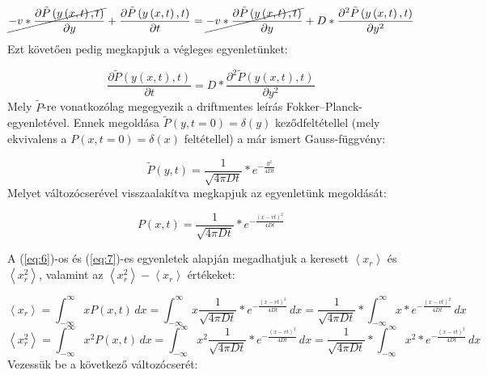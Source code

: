 \hrulefill
\begin{equation}
    \cancel{-v * \frac{\partial \tilde{P} \left( y \left( x, t \right), t \right)}{\partial y}}
    +
    \frac{\partial \tilde{P} \left( y \left( x, t \right), t \right)}{\partial t}
    =
    \cancel{-
    v * \frac{\partial \tilde{P} \left( y \left( x, t \right), t \right)}{\partial y}}
    +
    D * \frac{\partial^{2} \tilde{P} \left( y \left( x, t \right), t \right)}{\partial y^{2}}
\end{equation}
Ezt követően pedig megkapjuk a végleges egyenletünket:

\begin{equation}
    \frac{\partial \tilde{P} \left( y \left( x, t \right), t \right)}{\partial t}
    =
    D * \frac{\partial^{2} \tilde{P} \left( y \left( x, t \right), t \right)}{\partial y^{2}}
\end{equation}
Mely $\tilde{P}$-re vonatkozólag megegyezik a driftmentes leírás Fokker--Planck-egyenletével. Ennek megoldása $\tilde{P} \left( y, t = 0 \right) = \delta \left( y \right)$ keződfeltétellel (mely ekvivalens a $P \left( x, t = 0 \right) = \delta \left( x \right)$ feltétellel) a már ismert Gauss-függvény:

\begin{equation}
    \tilde{P} \left( y, t \right) = \frac{1}{\sqrt{4 \pi D t}} * e^{-\tfrac{y^{2}}{4Dt}}
\end{equation}
Melyet változócserével visszaalakítva megkapjuk az egyenletünk megoldását:

\begin{equation}
    \boxed{P \left( x, t \right) = \frac{1}{\sqrt{4 \pi D t}} * e^{-\tfrac{\left( x - vt \right)^{2}}{4Dt}}}
\end{equation}

A (\ref{eq:6})-os és (\ref{eq:7})-es egyenletek alapján megadhatjuk a keresett $\left< x_{r} \right>$ és $\left< x_{r}^{2} \right>$, valamint az $\left< x_{r}^{2} \right> - \left< x_{r} \right>$ értékeket:

\begin{equation}
    \left< x_{r} \right>
    =
    \int_{- \infty}^{\infty} x P \left( x, t \right)\, dx
    =
    \int_{- \infty}^{\infty} x \frac{1}{\sqrt{4 \pi D t}} * e^{-\tfrac{\left( x - vt \right)^{2}}{4Dt}}\, dx
    =
    \frac{1}{\sqrt{4 \pi D t}} * \int_{- \infty}^{\infty} x * e^{-\tfrac{\left( x - vt \right)^{2}}{4Dt}}\, dx
\end{equation}
\begin{equation}
    \left< x_{r}^{2} \right>
    =
    \int_{- \infty}^{\infty} x^{2} P \left( x, t \right)\, dx
    =
    \int_{- \infty}^{\infty} x^{2} \frac{1}{\sqrt{4 \pi D t}} * e^{-\tfrac{\left( x - vt \right)^{2}}{4Dt}}\, dx
    =
    \frac{1}{\sqrt{4 \pi D t}} * \int_{- \infty}^{\infty} x^{2} * e^{-\tfrac{\left( x - vt \right)^{2}}{4Dt}}\, dx
\end{equation}
Vezessük be a következő változócserét:

